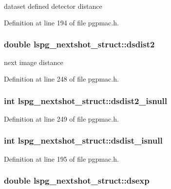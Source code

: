 dataset defined detector distance 

Definition at line 194 of file pgpmac.h.\hypertarget{structlspg__nextshot__struct_a516827749068577217b27860a01e6041}{
\subsubsection[{dsdist2}]{\setlength{\rightskip}{0pt plus 5cm}double {\bf lspg\_\-nextshot\_\-struct::dsdist2}}}
\label{structlspg__nextshot__struct_a516827749068577217b27860a01e6041}


next image distance 

Definition at line 248 of file pgpmac.h.\hypertarget{structlspg__nextshot__struct_a7fce65f4719a4a8110006f8b72eec3f7}{
\subsubsection[{dsdist2\_\-isnull}]{\setlength{\rightskip}{0pt plus 5cm}int {\bf lspg\_\-nextshot\_\-struct::dsdist2\_\-isnull}}}
\label{structlspg__nextshot__struct_a7fce65f4719a4a8110006f8b72eec3f7}


Definition at line 249 of file pgpmac.h.\hypertarget{structlspg__nextshot__struct_ac6f2bdc7b023d933509bf74af7b169f9}{
\subsubsection[{dsdist\_\-isnull}]{\setlength{\rightskip}{0pt plus 5cm}int {\bf lspg\_\-nextshot\_\-struct::dsdist\_\-isnull}}}
\label{structlspg__nextshot__struct_ac6f2bdc7b023d933509bf74af7b169f9}


Definition at line 195 of file pgpmac.h.\hypertarget{structlspg__nextshot__struct_a063e4c99201a763c2eb048acfc855efa}{
\subsubsection[{dsexp}]{\setlength{\rightskip}{0pt plus 5cm}double {\bf lspg\_\-nextshot\_\-struct::dsexp}}}
\label{structlspg__nextshot__struct_a063e4c99201a763c2eb048acfc855efa}


